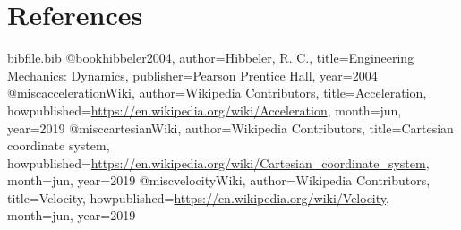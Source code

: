 \documentclass[12pt]{article}
\begin{document}
\section{References}
\label{Sec:References}
\begin{filecontents*}{bibfile.bib}
@book{hibbeler2004,
author={Hibbeler, R. C.},
title={Engineering Mechanics: Dynamics},
publisher={Pearson Prentice Hall},
year={2004}}
@misc{accelerationWiki,
author={Wikipedia Contributors},
title={Acceleration},
howpublished={\url{https://en.wikipedia.org/wiki/Acceleration}},
month=jun,
year={2019}}
@misc{cartesianWiki,
author={Wikipedia Contributors},
title={Cartesian coordinate system},
howpublished={\url{https://en.wikipedia.org/wiki/Cartesian\_coordinate\_system}},
month=jun,
year={2019}}
@misc{velocityWiki,
author={Wikipedia Contributors},
title={Velocity},
howpublished={\url{https://en.wikipedia.org/wiki/Velocity}},
month=jun,
year={2019}}
\end{filecontents*}
\nocite{*}
\printbibliography[heading=none]
\end{document}
